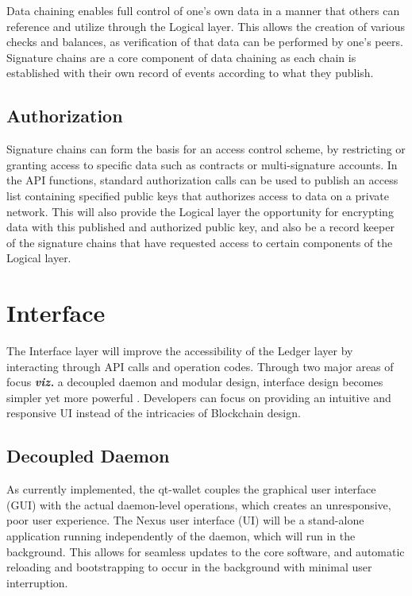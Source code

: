 \documentclass[11pt]{article}
\begin{document}
Data chaining enables full control of one's own data in a manner that others can reference and utilize through the Logical layer. This allows the creation of various checks and balances, as verification of that data can be performed by one's peers.
Signature chains are a core component of data chaining as each chain is established with their own record of events according to what they publish.

\subsection{Authorization}

Signature chains can form the basis for an access control scheme, by restricting or granting access to specific data such as contracts or multi-signature accounts.
In the API functions, standard authorization calls can be used to publish an access list containing specified public keys that authorizes access to data on a private network.
This will also provide the Logical layer the opportunity for encrypting data with this published and authorized public key, and also be a record keeper of the signature chains that have requested access to certain components of the Logical layer.


\section{Interface}

The Interface layer will improve the accessibility of the Ledger layer by interacting through API calls and operation codes.
Through two major areas of focus \textit{\textbf{viz.}} a decoupled daemon and modular design, interface design becomes simpler yet more powerful
.
Developers can focus on providing an intuitive and responsive UI instead of the intricacies of Blockchain design.

\subsection{Decoupled Daemon}

As currently implemented, the qt-wallet couples the graphical user interface (GUI) with the actual daemon-level operations, which creates an unresponsive, poor user experience.
The Nexus user interface (UI) will be a stand-alone application running independently of the daemon, which will run in the background. This allows for seamless updates to the core software, and automatic reloading and bootstrapping to occur in the background with minimal user interruption.
\end{document}
